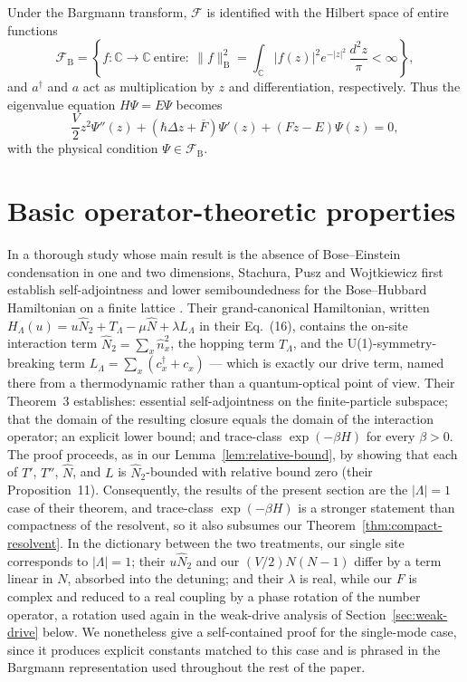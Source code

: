 \documentclass[11pt]{article}
\theoremstyle{remark}
\newcommand{\Fock}{\mathcal{F}}
\newcommand{\C}{\mathbb{C}}
\begin{document}
Under the Bargmann transform, \(\Fock\) is identified with
the Hilbert space of entire functions \cite{Bargmann1961Hilbert}
\begin{equation}
 \mathcal{F}_{\mathrm B}
 =\left\{f\colon\C\to\C\ \text{entire}:\
 \|f\|_{\mathrm B}^2=
 \int_{\C}|f(z)|^2e^{-|z|^2}\,\frac{d^2z}{\pi}<\infty\right\},
 \label{eq:Bargmann-space}
\end{equation}
and \(a^\dagger\) and \(a\) act as multiplication by \(z\) and differentiation,
respectively.  Thus the eigenvalue equation \(H\Psi=E\Psi\) becomes
\begin{equation}
 \frac{V}{2}z^2\Psi''(z)+(\hbar\Delta z+\overline F)\Psi'(z)
 +(Fz-E)\Psi(z)=0,
 \label{eq:Bargmann-ode}
\end{equation}
with the physical condition \(\Psi\in\mathcal{F}_{\mathrm B}\).

\section{Basic operator-theoretic properties}
\label{sec:operator-properties}

In a thorough study whose main result is the absence of Bose--Einstein
condensation in one and two dimensions, Stachura, Pusz and Wojtkiewicz first
establish self-adjointness and lower semiboundedness for the Bose--Hubbard
Hamiltonian on a finite lattice \cite{StachuraPuszWojtkiewicz2020BoseHubbard}.
Their grand-canonical Hamiltonian, written
\(H_\Lambda(u)=u\hat N_2+T_\Lambda-\mu\hat N+\lambda L_\Lambda\) in their
Eq.~(16), contains the on-site interaction term
\(\hat N_2=\sum_x\hat n_x^2\), the hopping term \(T_\Lambda\), and the
U(1)-symmetry-breaking term \(L_\Lambda=\sum_x(c_x^\dagger+c_x)\) --- which is
exactly our drive term, named there from a thermodynamic rather than a
quantum-optical point of view.  Their Theorem~3 establishes: essential
self-adjointness on the finite-particle subspace; that the domain of the
resulting closure equals the domain of the interaction operator; an explicit
lower bound; and trace-class \(\exp(-\beta H)\) for every \(\beta>0\).  The
proof proceeds, as in our Lemma~\ref{lem:relative-bound}, by showing that
each of \(T'\), \(T''\),
\(\hat N\), and \(L\) is \(\hat N_2\)-bounded with relative bound zero (their
Proposition~11).  Consequently, the results of the present section are the
\(|\Lambda|=1\) case of their theorem, and trace-class \(\exp(-\beta H)\) is a
stronger statement than compactness of the resolvent, so it also subsumes our
Theorem~\ref{thm:compact-resolvent}.  In the dictionary between the two
treatments, our single site corresponds to \(|\Lambda|=1\); their
\(u\hat N_2\) and our \((V/2)N(N-1)\) differ by a term linear in \(N\),
absorbed into the detuning; and their \(\lambda\) is real, while our \(F\) is
complex and reduced to a real coupling by a phase rotation of the number
operator, a rotation used again in the weak-drive analysis of
Section~\ref{sec:weak-drive} below.  We nonetheless give a self-contained
proof for the single-mode case, since it produces explicit
constants matched to this case and is phrased in the Bargmann representation
used throughout the rest of the paper.
\end{document}
